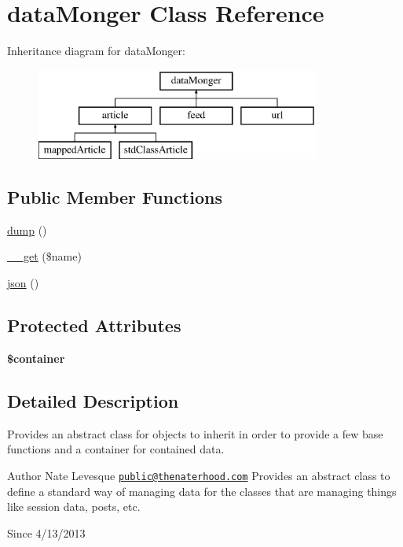 \hypertarget{classdataMonger}{\section{data\-Monger Class Reference}
\label{classdataMonger}
}
Inheritance diagram for data\-Monger\-:\begin{figure}[H]
\begin{center}
\leavevmode
\includegraphics[height=3.000000cm]{classdataMonger}
\end{center}
\end{figure}
\subsection*{Public Member Functions}
\begin{DoxyCompactItemize}
\item 
\hyperlink{classdataMonger_a5ad21a647bfa545e72230192f77d0d63}{dump} ()
\item 
\hyperlink{classdataMonger_ab4392db7fadc4a2a88d17d12e6f4e1b4}{\-\_\-\-\_\-get} (\$name)
\item 
\hyperlink{classdataMonger_a2f44c7904d8576a71622ac923edb5d0f}{json} ()
\end{DoxyCompactItemize}
\subsection*{Protected Attributes}
\begin{DoxyCompactItemize}
\item 
\hypertarget{classdataMonger_aca99065a518f42f3921385dad07b82b2}{{\bfseries \$container}}\label{classdataMonger_aca99065a518f42f3921385dad07b82b2}

\end{DoxyCompactItemize}


\subsection{Detailed Description}
Provides an abstract class for objects to inherit in order to provide a few base functions and a container for contained data. \begin{DoxyAuthor}{Author}
Nate Levesque \href{mailto:public@thenaterhood.com}{\tt public@thenaterhood.\-com} Provides an abstract class to define a standard way of managing data for the classes that are managing things like session data, posts, etc.
\end{DoxyAuthor}
\begin{DoxySince}{Since}
4/13/2013 
\end{DoxySince}


